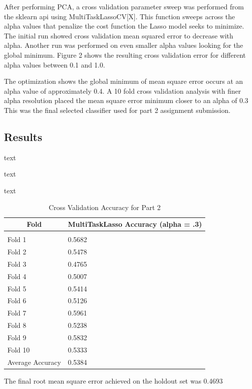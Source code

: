 \documentclass{article} %
\begin{document}
After performing PCA, a cross validation parameter sweep was performed from the sklearn api using MultiTaskLassoCV[X]. This function sweeps across the alpha values that penalize the cost function the Lasso model seeks to minimize. The initial run showed cross validation mean squared error to decrease with alpha. Another run was performed on even smaller alpha values looking for the global minimum. Figure 2 shows the resulting cross validation error for different alpha values between 0.1 and 1.0. 

The optimization shows the global minimum of mean square error occurs at an alpha value of approximately 0.4. A 10 fold cross validation analysis with finer alpha resolution placed the mean square error minimum closer to an alpha of 0.3 This was the final selected classifier used for part 2 assignment submission.


\subsection{Results}
text

text

text

\begin{table}[h]
\caption{Cross Validation Accuracy for Part 2}
\label{classtable}
\begin{center}
	\begin{tabular}{ll}
		\multicolumn{1}{c}{\bf Fold}  &\multicolumn{1}{c}{\bf MultiTaskLasso Accuracy (alpha = .3)} 
		\\ \hline \\
		Fold 1   &0.5682 \\
		Fold 2   &0.5478 \\
		Fold 3   &0.4765 \\
		Fold 4   &0.5007   \\
		Fold 5   &0.5414   \\
		Fold 6   &0.5126   \\
		Fold 7   &0.5961 \\
		Fold 8   &0.5238 \\
		Fold 9   &0.5832 \\
		Fold 10   &0.5333 \\
		Average Accuracy   &0.5384\\
	\end{tabular}
\end{center}
\end{table} 

The final root mean square error achieved on the holdout set was 0.4693
\end{document}
